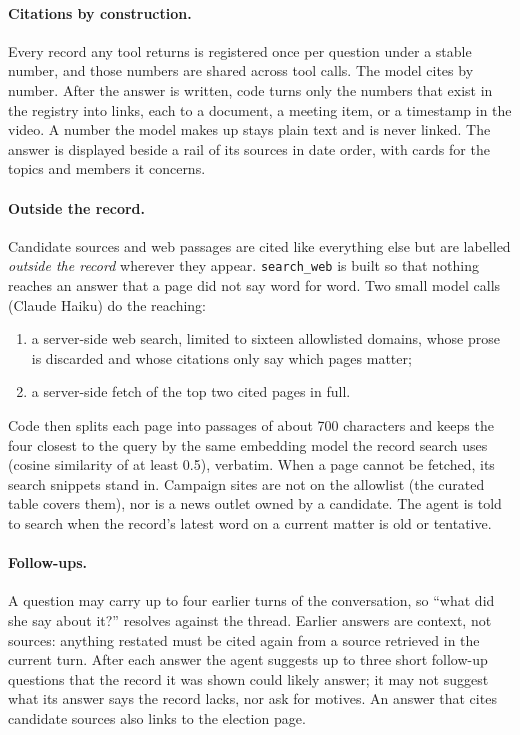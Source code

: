 \documentclass[11pt]{article}
\newcommand{\code}[1]{\texttt{#1}}
\begin{document}
\paragraph{Citations by construction.} Every record any tool returns is registered once
per question under a stable number, and those numbers are shared across tool calls. The
model cites by number. After the answer is written, code turns only the numbers that
exist in the registry into links, each to a document, a meeting item, or a timestamp in
the video. A number the model makes up stays plain text and is never linked. The answer
is displayed beside a rail of its sources in date order, with cards for the topics and
members it concerns.

\paragraph{Outside the record.} Candidate sources and web passages are cited like
everything else but are labelled \emph{outside the record} wherever they appear.
\code{search\_web} is built so that nothing reaches an answer that a page did not say
word for word. Two small model calls (Claude Haiku) do the reaching:
\begin{enumerate}
  \item a server-side web search, limited to sixteen allowlisted domains, whose prose is
        discarded and whose citations only say which pages matter;
  \item a server-side fetch of the top two cited pages in full.
\end{enumerate}
Code then splits each page into passages of about 700 characters and keeps the four
closest to the query by the same embedding model the record search uses (cosine
similarity of at least 0.5), verbatim. When a page cannot be fetched, its search
snippets stand in. Campaign sites are not on the allowlist (the curated table covers
them), nor is a news outlet owned by a candidate. The agent is told to search when the
record's latest word on a current matter is old or tentative.

\paragraph{Follow-ups.} A question may carry up to four earlier turns of the
conversation, so ``what did she say about it?'' resolves against the thread. Earlier
answers are context, not sources: anything restated must be cited again from a source
retrieved in the current turn. After each answer the agent suggests up to three short
follow-up questions that the record it was shown could likely answer; it may not
suggest what its answer says the record lacks, nor ask for motives. An answer that
cites candidate sources also links to the election page.
\end{document}
